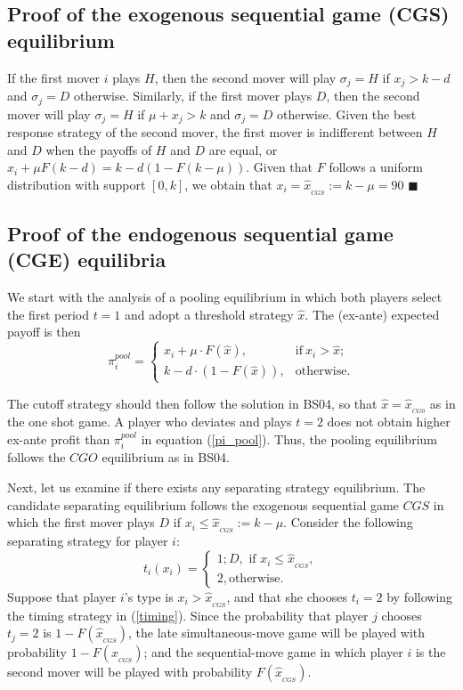 \documentclass[11pt, letterpaper]{article}
\theoremstyle{plain}
\begin{document}
\subsection*{Proof of the exogenous sequential game (CGS) equilibrium}

If the first mover $i$ plays $H$, then the second mover will play $\sigma_j= H$ if $x_j> k-d$ and $\sigma_j= D$ otherwise. Similarly, if the first mover plays $D$, then the second mover will play $\sigma_j= H$ if $\mu+x_j> k$ and  $\sigma_j= D$ otherwise. Given the best response strategy of the second mover, the first mover is indifferent between $H$ and $D$ when the payoffs of $H$ and $D$ are equal, or $x_i + \mu F(k-d) = k - d(1-F(k-\mu))$. Given that $F$ follows a uniform distribution with support $[0,k]$, we obtain that $x_i=\hat{x}_{_{CGS}}:= k-\mu=90$ $\blacksquare$

\subsection*{Proof of the endogenous sequential game (CGE) equilibria}

We start with the analysis of a pooling equilibrium in which both players select the first period $t=1$ and adopt a threshold strategy $\hat{x}$. The (ex-ante) expected payoff is then
\begin{equation}
   \pi^{pool}_{i} = 
   \begin{cases}
    x_i + \mu \cdot F(\hat{x}), &  \text{if} \  x_{i}> \hat{x};\\
    k - d \cdot (1-F(\hat{x})), & \text{otherwise}. 
   \end{cases}
   \label{pi_pool}
\end{equation}

The cutoff strategy should then follow the solution in BS04, so that $\hat{x}=\hat{x}_{_{CG0}}$ as in the one shot game. A player who deviates and plays $t=2$ does not obtain higher ex-ante profit than $\pi^{pool}_{i}$  in equation (\ref{pi_pool}). Thus, the pooling equilibrium follows the $CGO$ equilibrium as in BS04. 

Next, let us examine if there exists any separating strategy equilibrium. The candidate separating equilibrium follows the exogenous sequential game $CGS$ in which the first mover plays $D$ if $x_i\leq \hat{x}_{_{CGS}}:= k-\mu$. Consider the following separating strategy for player $i $:
\begin{equation}
 t_i(x_i)=
 \begin{cases} 1; D, \mbox{ if } x_i  \leq \hat{x}_{_{CGS}}, \\
 2,  \text{otherwise}.
 \end{cases}
 \label{timing}
\end{equation}
Suppose that player $i$'s type is $x_i >\hat{x}_{_{CGS}}$, and that she chooses $t_i=2$ by following the timing strategy  in (\ref{timing}).  Since the probability that player $j$ chooses $t_j=2$ is $1-F(\hat{x}_{_{CGS}})$, the late simultaneous-move game will be played with probability $1-F(\hat{x}_{_{CGS}})$; and the sequential-move game in which player $i$ is the second mover will be played with probability $F(\hat{x}_{_{CGS}})$.
\end{document}
